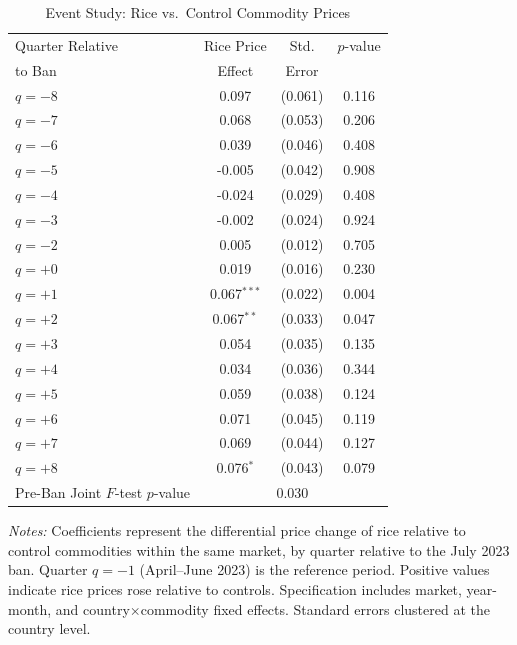 \begin{table}[htbp]
\centering
\caption{Event Study: Rice vs.\ Control Commodity Prices}
\label{tab:event}
\begin{threeparttable}
\begin{tabular}{lccc}
\hline\hline
Quarter Relative & Rice Price & Std. & $p$-value \\
to Ban & Effect & Error & \\
\hline
$q = -8$ & 0.097 & (0.061) & 0.116 \\
$q = -7$ & 0.068 & (0.053) & 0.206 \\
$q = -6$ & 0.039 & (0.046) & 0.408 \\
$q = -5$ & -0.005 & (0.042) & 0.908 \\
$q = -4$ & -0.024 & (0.029) & 0.408 \\
$q = -3$ & -0.002 & (0.024) & 0.924 \\
$q = -2$ & 0.005 & (0.012) & 0.705 \\
$q = +0$ & 0.019 & (0.016) & 0.230 \\
$q = +1$ & 0.067$^{***}$ & (0.022) & 0.004 \\
$q = +2$ & 0.067$^{**}$ & (0.033) & 0.047 \\
$q = +3$ & 0.054 & (0.035) & 0.135 \\
$q = +4$ & 0.034 & (0.036) & 0.344 \\
$q = +5$ & 0.059 & (0.038) & 0.124 \\
$q = +6$ & 0.071 & (0.045) & 0.119 \\
$q = +7$ & 0.069 & (0.044) & 0.127 \\
$q = +8$ & 0.076$^{*}$ & (0.043) & 0.079 \\
\hline
Pre-Ban Joint $F$-test $p$-value & \multicolumn{3}{c}{0.030} \\
\hline\hline
\end{tabular}
\begin{tablenotes}[flushleft]\small
\item \textit{Notes:} Coefficients represent the differential price change of rice relative to control commodities within the same market, by quarter relative to the July 2023 ban. Quarter $q = -1$ (April--June 2023) is the reference period. Positive values indicate rice prices rose relative to controls. Specification includes market, year-month, and country$\times$commodity fixed effects. Standard errors clustered at the country level.
\end{tablenotes}
\end{threeparttable}
\end{table}
